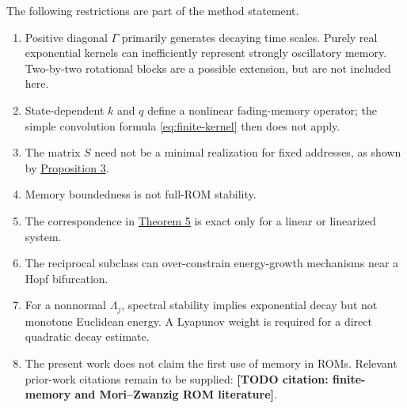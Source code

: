 The following restrictions are part of the method statement.
\begin{enumerate}
 \item Positive diagonal $\Gamma$ primarily generates decaying time scales.
 Purely real exponential kernels can inefficiently represent strongly
 oscillatory memory. Two-by-two rotational blocks are a possible extension,
 but are not included here.
 \item State-dependent $k$ and $q$ define a nonlinear fading-memory operator;
 the simple convolution formula \eqref{eq:finite-kernel} then does not apply.
 \item The matrix $S$ need not be a minimal realization for fixed addresses,
 as shown by \hyperref[prop:fixed-key]{Proposition 3}.
 \item Memory boundedness is not full-ROM stability.
 \item The correspondence in
 \hyperref[thm:linear-elimination]{Theorem 5} is exact only for a linear or
 linearized system.
 \item The reciprocal subclass can over-constrain energy-growth mechanisms
 near a Hopf bifurcation.
 \item For a nonnormal $\Lambda_j$, spectral stability implies exponential
 decay but not monotone Euclidean energy. A Lyapunov weight is required for a
 direct quadratic decay estimate.
 \item The present work does not claim the first use of memory in ROMs.
 Relevant prior-work citations remain to be supplied:
 \textbf{[TODO citation: finite-memory and Mori--Zwanzig ROM literature]}.
\end{enumerate}
